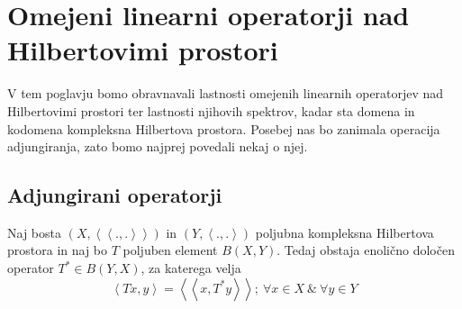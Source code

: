 \documentclass[mat2]{matdelo}
\newcommand{\Sp}[2]{\ensuremath{\left<#1, #2\right>}}
\newcommand{\Spp}[2]{\ensuremath{\left<\left<#1, #2\right>\right>}}
\begin{document}
	\section{Omejeni linearni operatorji nad Hilbertovimi prostori}
		V tem poglavju bomo obravnavali lastnosti omejenih linearnih operatorjev nad Hilbertovimi prostori ter lastnosti njihovih spektrov, kadar sta domena in kodomena kompleksna Hilbertova prostora. Posebej nas bo zanimala operacija adjungiranja, zato bomo najprej povedali nekaj o njej.
		\subsection{Adjungirani operatorji}
		
			\begin{izrek}
				\label{izr:Adjexist}
				Naj bosta $(X, \Spp{.}{.})$ in $(Y, \Sp{.}{.})$ poljubna kompleksna Hilbertova prostora in naj bo $T$ poljuben element $B(X, Y)$. Tedaj obstaja enolično določen operator $T^*\in B(Y, X)$, za katerega velja $$\Sp{Tx}{y} = \Spp{x}{T^*y};~\forall x\in X~\&~\forall y \in Y $$
			\end{izrek}
			
\end{document}
